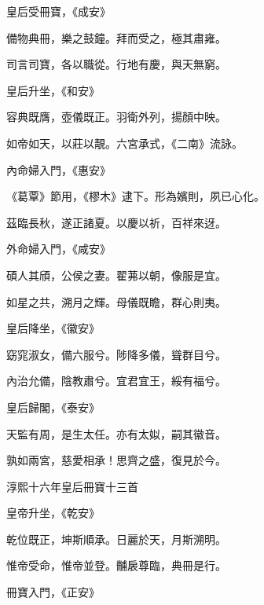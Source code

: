 \begin{pinyinscope}
 皇后受冊寶，《成安》



 備物典冊，樂之鼓鐘。拜而受之，極其肅雍。



 司言司寶，各以職從。行地有慶，與天無窮。



 皇后升坐，《和安》



 容典既膺，壺儀既正。羽衛外列，揚顏中映。



 如帝如天，以莊以靚。六宮承式，《二南》流詠。



 內命婦入門，《惠安》



 《葛覃》節用，《樛木》逮下。形為嬪則，夙已心化。



 茲臨長秋，遂正諸夏。以慶以祈，百祥來迓。



 外命婦入門，《咸安》



 碩人其頎，公侯之妻。翟茀以朝，像服是宜。



 如星之共，溯月之輝。母儀既瞻，群心則夷。



 皇后降坐，《徽安》



 窈窕淑女，備六服兮。陟降多儀，聳群目兮。



 內治允備，陰教肅兮。宜君宜王，綏有福兮。



 皇后歸閣，《泰安》



 天監有周，是生太任。亦有太姒，嗣其徽音。



 孰如兩宮，慈愛相承！思齊之盛，復見於今。



 淳熙十六年皇后冊寶十三首



 皇帝升坐，《乾安》



 乾位既正，坤斯順承。日麗於天，月斯溯明。



 惟帝受命，惟帝並登。黼扆尊臨，典冊是行。



 冊寶入門，《正安》




\end{pinyinscope}
